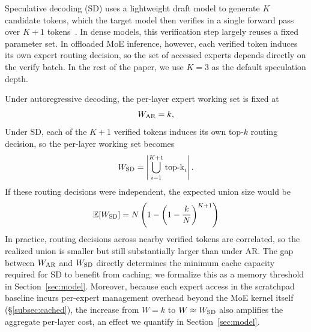 Speculative decoding (SD) uses a lightweight draft model to generate $K$ candidate tokens, which the target model then verifies in a single forward pass over $K{+}1$ tokens~\cite{leviathan2023fast,chen2023accelerating}. In dense models, this verification step largely reuses a fixed parameter set. In offloaded MoE inference, however, each verified token induces its own expert routing decision, so the set of accessed experts depends directly on the verify batch. In the rest of the paper, we use $K{=}3$ as the default speculation depth.

Under autoregressive decoding, the per-layer expert working set is fixed at
\[
W_{\mathrm{AR}} = k,
\]
Under SD, each of the $K{+}1$ verified tokens induces its own top-$k$ routing decision, so the per-layer working set becomes
\[
W_{\mathrm{SD}} = \left|\bigcup_{i=1}^{K+1} \mathrm{top\text{-}k}_i\right|.
\]
If these routing decisions were independent, the expected union size would be
\begin{equation}
\mathbb{E}[W_{\mathrm{SD}}]
=
N \left(1-\left(1-\frac{k}{N}\right)^{K+1}\right)
\end{equation}
In practice, routing decisions across nearby verified tokens are correlated, so the realized union is smaller but still substantially larger than under AR. The gap between $W_{\mathrm{AR}}$ and $W_{\mathrm{SD}}$ directly determines the minimum cache capacity required for SD to benefit from caching; we formalize this as a memory threshold in Section~\ref{sec:model}. Moreover, because each expert access in the scratchpad baseline incurs per-expert management overhead beyond the MoE kernel itself (\S\ref{subsec:cached}), the increase from $W=k$ to $W\approx W_{\mathrm{SD}}$ also amplifies the aggregate per-layer cost, an effect we quantify in Section~\ref{sec:model}.

